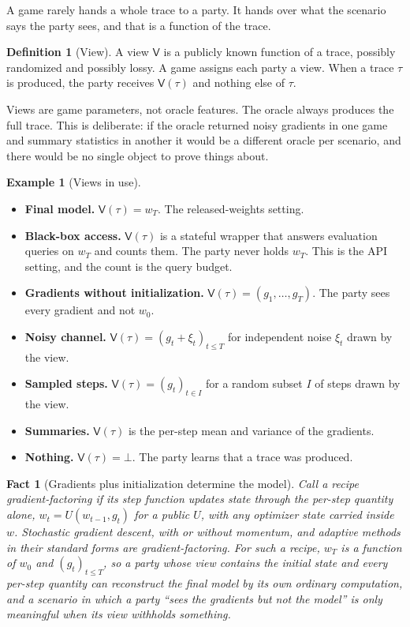\documentclass[11pt]{article}
\theoremstyle{definition}
\newtheorem{definition}{Definition}
\newtheorem{example}{Example}
\theoremstyle{plain}
\newtheorem{fact}{Fact}
\theoremstyle{remark}
\newcommand{\Tr}{\tau}
\newcommand{\View}{\mathsf{V}}
\begin{document}
A game rarely hands a whole trace to a party. It hands over what the scenario says
the party sees, and that is a function of the trace.

\begin{definition}[View]
\label{def:view}
A view $\View$ is a publicly known function of a trace, possibly randomized and
possibly lossy. A game assigns each party a view. When a trace $\Tr$ is produced,
the party receives $\View(\Tr)$ and nothing else of $\Tr$.
\end{definition}

Views are game parameters, not oracle features. The oracle always produces the
full trace. This is deliberate: if the oracle returned noisy gradients in one game
and summary statistics in another it would be a different oracle per scenario, and
there would be no single object to prove things about.

\begin{example}[Views in use]
\label{ex:views}
\begin{itemize}
  \item \textbf{Final model.} $\View(\Tr) = w_T$. The released-weights setting.
  \item \textbf{Black-box access.} $\View(\Tr)$ is a stateful wrapper that answers
        evaluation queries on $w_T$ and counts them. The party never holds $w_T$.
        This is the API setting, and the count is the query budget.
  \item \textbf{Gradients without initialization.}
        $\View(\Tr) = (g_1, \dots, g_T)$. The party sees every gradient and not
        $w_0$.
  \item \textbf{Noisy channel.} $\View(\Tr) = (g_t + \xi_t)_{t \le T}$ for
        independent noise $\xi_t$ drawn by the view.
  \item \textbf{Sampled steps.} $\View(\Tr) = (g_t)_{t \in I}$ for a random subset
        $I$ of steps drawn by the view.
  \item \textbf{Summaries.} $\View(\Tr)$ is the per-step mean and variance of the
        gradients.
  \item \textbf{Nothing.} $\View(\Tr) = \bot$. The party learns that a trace was
        produced.
\end{itemize}
\end{example}

\begin{fact}[Gradients plus initialization determine the model]
\label{fact:determine}
Call a recipe \emph{gradient-factoring} if its step function updates state
through the per-step quantity alone, $w_t = U(w_{t-1}, g_t)$ for a public $U$,
with any optimizer state carried inside $w$. Stochastic gradient descent, with
or without momentum, and adaptive methods in their standard forms are
gradient-factoring. For such a recipe, $w_T$ is a function of $w_0$ and
$(g_t)_{t \le T}$, so a party whose view contains the initial state and every
per-step quantity can reconstruct the final model by its own ordinary
computation, and a scenario in which a party ``sees the gradients but not the
model'' is only meaningful when its view withholds something.
\end{fact}
\end{document}
